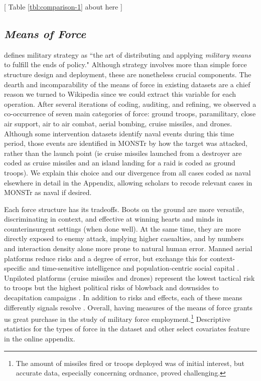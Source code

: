 \documentclass[fleqn,12pt]{article}
\begin{document}
\begin{center}
	[ Table \ref{tbl:comparison-1} about here ]
\end{center}

\subsection*{\textit{Means of Force}}
\citet[335]{hart_strategyindirectapproach_1967} defines military strategy as ``the art of distributing and applying \textit{military means} to fulfill the ends of policy." Although strategy involves more than simple force structure design and deployment, these are nonetheless crucial components. The dearth and incomparability of the means of force in existing datasets are a chief reason we turned to Wikipedia since we could extract this variable for each operation. After several iterations of coding, auditing, and refining, we observed a co-occurrence of seven main categories of force: ground troops, paramilitary, close air support, air to air combat, aerial bombing, cruise missiles, and drones. Although some intervention datasets identify naval events during this time period, those events are identified in MONSTr by how the target was attacked, rather than the launch point (ie cruise missiles launched from a destroyer are coded as cruise missiles and an island landing for a raid is coded as ground troops). We explain this choice and our divergence from all cases coded as naval elsewhere in detail in the Appendix, allowing scholars to recode relevant cases in MONSTr as naval if desired.

Each force structure has its tradeoffs. Boots on the ground are more versatile, discriminating in context, and effective at winning hearts and minds in counterinsurgent settings (when done well). At the same time, they are more directly exposed to enemy attack, implying higher casualties, and by numbers and interaction density alone more prone to natural human error. Manned aerial platforms reduce risks and a degree of error, but exchange this for context-specific and time-sensitive intelligence and population-centric social capital \citep{lyall_ragemachinesexplaining_2009}. Unpiloted platforms (cruise missiles and drones) represent the lowest tactical risk to troops but the highest political risks of blowback \citep{johnston_impactusdrone_2016} and downsides to decapitation campaigns \citep{price_targetingtopterrorists_2012}. In addition to risks and effects, each of these means differently signals resolve \citep{zegart_cheapfightscredible_2018}. Overall, having measures of the means of force grants us great purchase in the study of military force employment.\footnote{The amount of missiles fired or troops deployed was of initial interest, but accurate data, especially concerning ordnance, proved challenging.} Descriptive statistics for the types of force in the dataset and other select covariates feature in the online appendix.
\end{document}
